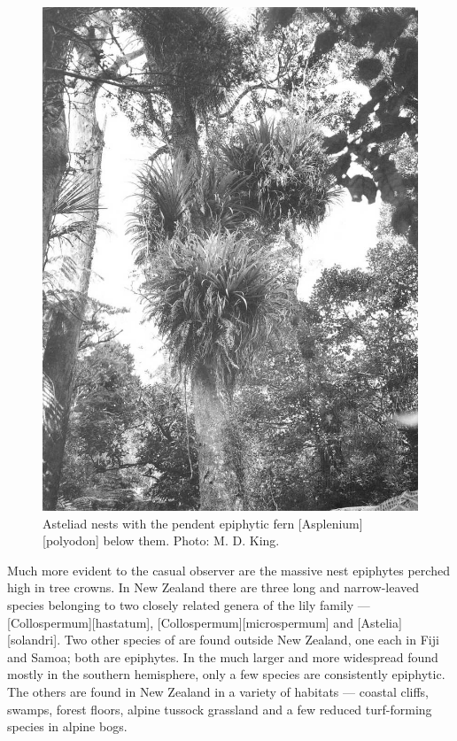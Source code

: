 \begin{figure}[!htb]
\begin{minipage}[t]{0.543\textwidth}
    	\centering
    	\includegraphics[width=\textwidth]{graphics/figure40asteliad.jpg}
    	\caption[Asteliad nests with the pendent epiphytic fern]{Asteliad nests with the pendent epiphytic fern [Asplenium][polyodon] below them.
    	Photo: M. D. King.}%
    	\label{fig:40asteliad}
	\end{minipage}
\end{figure}

Much more evident to the casual observer are the massive nest epiphytes perched high in tree crowns.
In New Zealand there are three long and narrow-leaved species belonging to two closely related genera of the lily family --- [Collospermum][hastatum], [Collospermum][microspermum] and [Astelia][solandri].
Two other species of  are found outside New Zealand, one each in Fiji and Samoa; both are epiphytes.
In the much larger and more widespread  found mostly in the southern hemisphere, only a few species are consistently epiphytic.
The others are found in New Zealand in a variety of habitats --- coastal cliffs, swamps, forest floors, alpine tussock grassland and a few reduced turf-forming species in alpine bogs.

